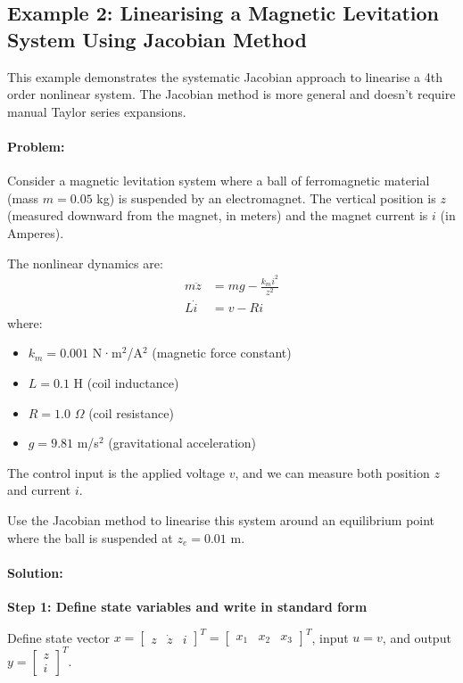 \documentclass[11pt,a4paper]{article}
\begin{document}
\subsection{Example 2: Linearising a Magnetic Levitation System Using Jacobian Method}

This example demonstrates the systematic Jacobian approach to linearise a 4th order nonlinear system. The Jacobian method is more general and doesn't require manual Taylor series expansions.

\paragraph{Problem:}
Consider a magnetic levitation system where a ball of ferromagnetic material (mass $m = 0.05$ kg) is suspended by an electromagnet. The vertical position is $z$ (measured downward from the magnet, in meters) and the magnet current is $i$ (in Amperes).

The nonlinear dynamics are:
\begin{align}
m\ddot{z} &= mg - \frac{k_m i^2}{z^2}\\
L\dot{i} &= v - Ri
\end{align}
where:
\begin{itemize}
\item $k_m = 0.001$ N·m$^2$/A$^2$ (magnetic force constant)
\item $L = 0.1$ H (coil inductance)
\item $R = 1.0$ $\Omega$ (coil resistance)
\item $g = 9.81$ m/s$^2$ (gravitational acceleration)
\end{itemize}

The control input is the applied voltage $v$, and we can measure both position $z$ and current $i$.

Use the Jacobian method to linearise this system around an equilibrium point where the ball is suspended at $z_e = 0.01$ m.

\paragraph{Solution:}

\textbf{Step 1: Define state variables and write in standard form}

Define state vector $x = \begin{bmatrix} z & \dot{z} & i \end{bmatrix}^T = \begin{bmatrix} x_1 & x_2 & x_3 \end{bmatrix}^T$, input $u = v$, and output $y = \begin{bmatrix} z \\ i \end{bmatrix}^T$.
\end{document}
